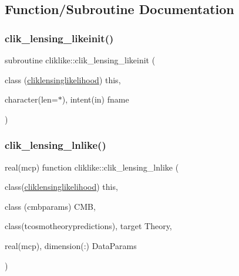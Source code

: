 \subsection{Function/\+Subroutine Documentation}
\mbox{\label{namespacecliklike_af1724949f007a273de7b121db709494d}} 
\subsubsection{\texorpdfstring{clik\+\_\+lensing\+\_\+likeinit()}{clik\_lensing\_likeinit()}}
{\footnotesize\ttfamily subroutine cliklike\+::clik\+\_\+lensing\+\_\+likeinit (\begin{DoxyParamCaption}\item[{class (\mbox{\hyperlink{structcliklike_1_1cliklensinglikelihood}{cliklensinglikelihood}})}]{this,  }\item[{character(len=$\ast$), intent(in)}]{fname }\end{DoxyParamCaption})\hspace{0.3cm}{\ttfamily [private]}}

\mbox{\label{namespacecliklike_ad4622dfac7ccf0cffb96b6b9d1e097d9}} 
\subsubsection{\texorpdfstring{clik\+\_\+lensing\+\_\+lnlike()}{clik\_lensing\_lnlike()}}
{\footnotesize\ttfamily real(mcp) function cliklike\+::clik\+\_\+lensing\+\_\+lnlike (\begin{DoxyParamCaption}\item[{class(\mbox{\hyperlink{structcliklike_1_1cliklensinglikelihood}{cliklensinglikelihood}})}]{this,  }\item[{class (cmbparams)}]{C\+MB,  }\item[{class(tcosmotheorypredictions), target}]{Theory,  }\item[{real(mcp), dimension(\+:)}]{Data\+Params }\end{DoxyParamCaption})\hspace{0.3cm}{\ttfamily [private]}}

